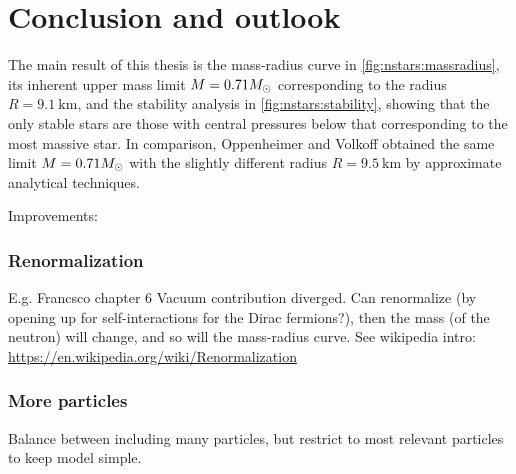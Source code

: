 \chapter*{Conclusion and outlook}
\label{chap:conclusion}



The main result of this thesis is the mass-radius curve in \cref{fig:nstars:massradius}, its inherent upper mass limit $M = 0.71 M_\odot$ corresponding to the radius $R = \SI{9.1}{\kilo\meter}$, and the stability analysis in \cref{fig:nstars:stability}, showing that the only stable stars are those with central pressures below that corresponding to the most massive star.
In comparison, Oppenheimer and Volkoff obtained the same limit $M = 0.71 M_\odot$ with the slightly different radius $R = \SI{9.5}{\kilo\meter}$ by approximate analytical techniques. \cite{ref:tov}


Improvements:

\subsection*{Renormalization}

E.g. Francsco chapter 6
Vacuum contribution diverged.
Can renormalize (by opening up for self-interactions for the Dirac fermions?), then the mass (of the neutron) will change, and so will the mass-radius curve.
See wikipedia intro: \url{https://en.wikipedia.org/wiki/Renormalization}

\subsection*{More particles}

Balance between including many particles, but restrict to most relevant particles to keep model simple.

